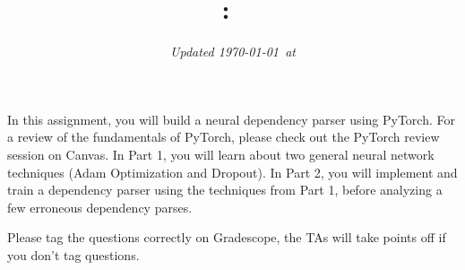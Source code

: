 \documentclass[answers]{exam}
\title{
\vspace{-1in}
\textmd{\textbf{\hmwkClass:\ \hmwkTitle}}
}
\author{}
\date{\textit{\small Updated \today\ at \currenttime}} %
\date{}
\begin{document}
\maketitle

In this assignment, you will build a neural dependency parser using PyTorch. For a review of the fundamentals of PyTorch, please check out the PyTorch review session on Canvas.  In Part 1, you will learn about two general neural network techniques (Adam Optimization and Dropout). In Part 2, you will implement and train a dependency parser using the techniques from Part 1, before analyzing a few erroneous dependency parses.

Please tag the questions correctly on Gradescope, the TAs  will take points off if you don't tag questions. 
\begin{questions}
    
    \newpage
    
\end{questions}


\end{document}
